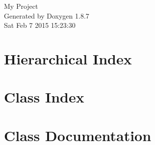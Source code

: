 \documentclass[twoside]{book}
\newcommand{\+}{\discretionary{\mbox{\scriptsize$\hookleftarrow$}}{}{}}
\newcommand{\clearemptydoublepage}{%
  \newpage{\pagestyle{empty}\cleardoublepage}%
}
\begin{document}
\hypersetup{pageanchor=false,
             bookmarks=true,
             bookmarksnumbered=true,
             pdfencoding=unicode
            }
\begin{titlepage}
\vspace*{7cm}
\begin{center}%
{\Large My Project }\\
\vspace*{1cm}
{\large Generated by Doxygen 1.8.7}\\
\vspace*{0.5cm}
{\small Sat Feb 7 2015 15:23:30}\\
\end{center}
\end{titlepage}
\clearemptydoublepage
\tableofcontents
\clearemptydoublepage
{}
\hypersetup{pageanchor=true}

\chapter{Hierarchical Index}

\chapter{Class Index}

\chapter{Class Documentation}



































\newpage
{}
{}
\printindex
\end{document}
